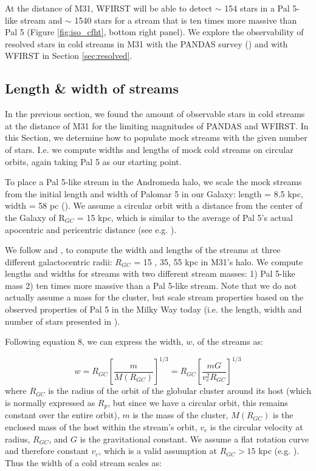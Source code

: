 \documentclass[twocolumn]{aastex62}
\begin{document}
At the distance of M31, WFIRST will be able to detect $\sim$ 154 stars in a Pal 5-like stream and $\sim$ 1540 stars for a stream that is ten times more massive than Pal 5 (Figure \ref{fig:iso_cfht}, bottom right panel). We explore the observability of resolved stars in cold streams in M31 with the PANDAS survey (\citealt{mcconnachie09}) and with WFIRST in Section \ref{sec:resolved}. 




\subsection{Length \& width of streams}
\label{sec:length}
In the previous section, we found the amount of observable stars in cold streams at the distance of M31 for the limiting magnitudes of PANDAS and WFIRST. In this Section, we determine how to populate mock streams with the given number of stars. I.e. we compute widths and lengths of mock cold streams on circular orbits, again taking Pal 5 as our starting point. 

To place a Pal 5-like stream in the Andromeda halo, %
we scale the mock streams from the initial length and width of Palomar 5 in our Galaxy: length = 8.5 kpc, width = 58 pc (\citealt{ibata16}). We assume a circular orbit with a distance from the center of the Galaxy of R$_{GC}$ = 15 kpc, which is similar to the average of Pal 5's actual apocentric and pericentric distance (see e.g. \citealt{erkal17}). 

We follow \citet{johnston98} and \citet{johnston01}, to compute the width and lengths of the streams at three different galactocentric radii: $R_{GC}$ = 15 , 35, 55 kpc in M31's halo. We compute lengths and widths for streams with two different stream masses: 1) Pal 5-like mass 2) ten times more massive than a Pal 5-like stream. Note that we do not actually assume a mass for the cluster, but scale stream properties based on the observed properties of Pal 5 in the Milky Way today (i.e. the length, width and number of stars presented in \citealt{ibata16}).  

Following \citet{johnston01} equation 8, we can express the width, $w$, of the streams as:

\begin{equation}
w = R_{GC} \left[\frac{m}{M(R_{GC})}\right]^{1/3} = R_{GC} \left[\frac{m G}{v_c^2 R_{GC}}\right]^{1/3} 
\end{equation}
where $R_{GC}$ is the radius of the orbit of the globular cluster around its host (which is normally expressed as $R_p$, but since we have a circular orbit, this remains constant over the entire orbit), $m$ is the mass of the cluster, $M(R_{GC})$ is the enclosed mass of the host within the stream's orbit, $v_c$ is the circular velocity at radius, $R_{GC}$, and $G$ is the gravitational constant. We assume a flat rotation curve and therefore constant  $v_c$, which is a valid assumption at $R_{GC} > 15$ kpc (e.g. \citealt{chemin09}). Thus the width of a cold stream scales as:
\end{document}
